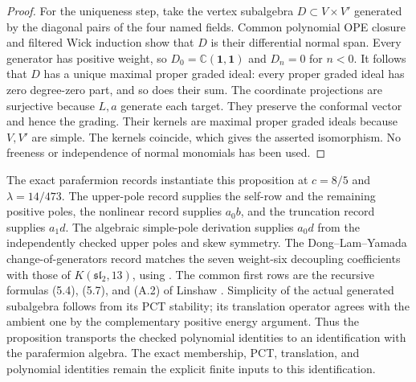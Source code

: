 \begin{proof}
For the uniqueness step, take the vertex subalgebra $D\subset V\times V'$
generated by the diagonal pairs of the four named fields. Common
polynomial OPE closure and filtered Wick induction show that $D$ is
their differential normal span. Every generator has positive weight,
so $D_0=\mathbb C(\mathbf1,\mathbf1)$ and $D_n=0$ for $n<0$.
It follows that $D$ has a unique maximal proper graded ideal: every
proper graded ideal has zero degree-zero part, and so does their sum.
The coordinate projections are surjective because $L,a$ generate
each target. They preserve the conformal vector and hence the grading.
Their kernels are maximal proper graded ideals because $V,V'$ are
simple. The kernels coincide, which gives the asserted isomorphism.
No freeness or independence of normal monomials has been used.
\end{proof}

The exact parafermion records instantiate this proposition at
$c=8/5$ and $\lambda=14/473$. The upper-pole record supplies the
self-row and the remaining positive poles, the nonlinear record
supplies $a_0b$, and the truncation record supplies $a_1d$.
The algebraic simple-pole derivation supplies $a_0d$ from the
independently checked upper poles and skew symmetry. The
Dong--Lam--Yamada change-of-generators record matches the seven
weight-six decoupling coefficients with those of
$K(\mathfrak{sl}_2,13)$, using \cite[Appendix B]{DLY}. The common first rows are the recursive
formulas (5.4), (5.7), and (A.2) of Linshaw \cite{Linshaw}. Simplicity of the actual
generated subalgebra follows from its PCT stability; its translation
operator agrees with the ambient one by the complementary positive
energy argument. Thus the proposition transports the checked
polynomial identities to an identification with the parafermion
algebra. The exact membership, PCT, translation, and polynomial
identities remain the explicit finite inputs to this identification.

